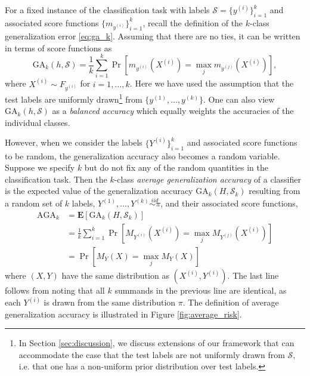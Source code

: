 \documentclass[twoside,11pt]{article}
\newcommand{\E}{\textbf{E}}
\begin{document}
For a fixed instance of the classification task with labels
$\mathcal{S} = \{y^{(i)}\}_{i=1}^k$ and associated score functions
$\{m_{y^{(i)}}\}_{i=1}^k$, recall the definition of the $k$-class
generalization error \eqref{eq:ga_k}.  Assuming that there are no
ties, it can be written in terms of score functions as
\[
\text{GA}_k(h, \mathcal{S}) = \frac{1}{k} \sum_{i=1}^k  \Pr[m_{y^{(i)}}(X^{(i)}) = \max_j
m_{y^{(j)}}(X^{(i)})],
\]
where $X^{(i)} \sim F_{y^{(i)}}$ for $i =1,\hdots, k$.  Here we have used the assumption that the test labels are uniformly drawn\footnote{In Section \ref{sec:discussion}, we discuss extensions of our framework that can accommodate the case that the test labels are not uniformly drawn from $\mathcal{S}$, i.e. that one has a non-uniform prior distribution over test labels.} from $\{y^{(1)},\hdots, y^{(k)}\}$.
One can also view $\text{GA}_k(h, \mathcal{S})$ as a \emph{balanced accuracy} which equally weights the accuracies of the individual classes.

However, when we consider the labels $\{Y^{(i)}\}_{i=1}^k$ and associated score
functions to be random, the generalization accuracy also becomes a
random variable.%
Suppose we specify $k$ but do not fix any of the random quantities in
the classification task.  Then the $k$-class \emph{average
  generalization accuracy} of a classifier is the expected value of
the generalization accuracy $\text{GA}_k(H, \mathcal{S}_k)$ resulting from a random
set of $k$ labels, $Y^{(1)}, \hdots, Y^{(k)} \stackrel{iid}{\sim
  \pi}$, and their associated score functions,
\begin{align*}
\text{AGA}_k &= \E[\text{GA}_k(H, \mathcal{S}_k)]
\\&= \frac{1}{k} \sum_{i=1}^k \Pr[M_{Y^{(i)}}(X^{(i)}) = \max_j
M_{Y^{(j)}}(X^{(i)})]
\\&= \Pr[M_{Y}(X) = \max_j M_{Y}(X)]
\end{align*}
where $(X,Y)$ have the same distribution as $(X^{(i)}, Y^{(i)})$. %
The last line follows from noting that all $k$ summands in the
previous line are identical, as each $Y^{(i)}$ is drawn from the same distribution $\pi$.  %
The definition of average
  generalization accuracy is illustrated in Figure
  \ref{fig:average_risk}.
\end{document}
